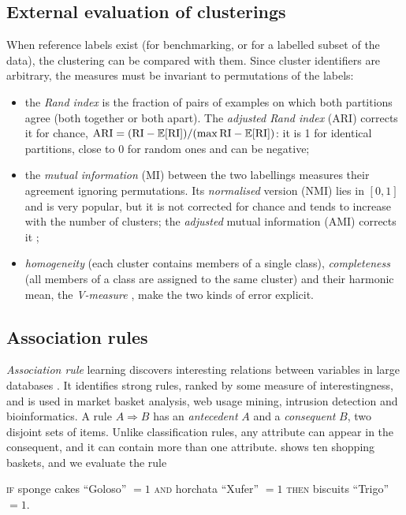 \subsection{External evaluation of clusterings}

When reference labels exist (for benchmarking, or for a labelled subset of the data), the
clustering can be compared with them. Since cluster identifiers are arbitrary, the measures
must be invariant to permutations of the labels:
\begin{itemize}
  \item the \emph{Rand index} \citep{rand1971objective} is the fraction of pairs of examples
        on which both partitions agree (both together or both apart). The \emph{adjusted Rand
        index} (ARI) \citep{hubert1985comparing} corrects it for chance,
        $\mathrm{ARI}=(\mathrm{RI}-\mathbb{E}[\mathrm{RI}])/(\max\mathrm{RI}-\mathbb{E}[\mathrm{RI}])$: it is 1
        for identical partitions, close to 0 for random ones and can be negative;
  \item the \emph{mutual information} (MI) between the two labellings measures their agreement
        ignoring permutations. Its \emph{normalised} version (NMI) \citep{strehl2002cluster}
        lies in $[0,1]$ and is very popular, but it is not corrected for chance and tends to
        increase with the number of clusters; the \emph{adjusted} mutual information (AMI)
        corrects it \citep{vinh2010information};
  \item \emph{homogeneity} (each cluster contains members of a single class),
        \emph{completeness} (all members of a class are assigned to the same cluster) and their
        harmonic mean, the \emph{V-measure} \citep{rosenberg2007vmeasure}, make the two kinds
        of error explicit.
\end{itemize}

\subsection{Association rules}

\emph{Association rule} learning discovers interesting relations between variables in large
databases \citep{agrawal1993mining}. It identifies strong rules, ranked by some measure of
interestingness, and is used in market basket analysis, web usage mining, intrusion detection
and bioinformatics. A rule $A\Rightarrow B$ has an \emph{antecedent} $A$ and a
\emph{consequent} $B$, two disjoint sets of items. Unlike classification rules, any attribute can
appear in the consequent, and it can contain more than one attribute.  shows
ten shopping baskets, and we evaluate the rule
\begin{center}
\textsc{if} sponge cakes ``Goloso'' $=1$ \textsc{and} horchata ``Xufer'' $=1$
\textsc{then} biscuits ``Trigo'' $=1$.
\end{center}

